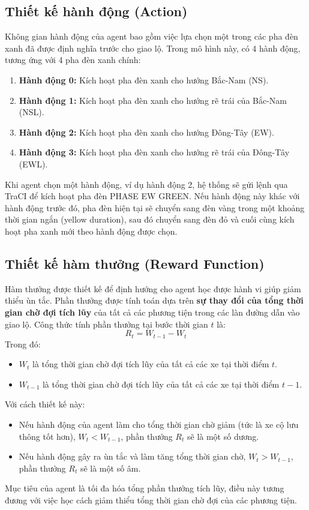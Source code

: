 \subsection{Thiết kế hành động (Action)}
Không gian hành động của agent bao gồm việc lựa chọn một trong các pha đèn xanh
đã được định nghĩa trước cho giao lộ. Trong mô hình này, có 4 hành động, tương ứng
với 4 pha đèn xanh chính:
\begin{enumerate}
    \item \textbf{Hành động 0:} Kích hoạt pha đèn xanh cho hướng Bắc-Nam (NS).

    \item \textbf{Hành động 1:} Kích hoạt pha đèn xanh cho hướng rẽ trái của Bắc-Nam
        (NSL).

    \item \textbf{Hành động 2:} Kích hoạt pha đèn xanh cho hướng Đông-Tây (EW).

    \item \textbf{Hành động 3:} Kích hoạt pha đèn xanh cho hướng rẽ trái của
        Đông-Tây (EWL).
\end{enumerate}

Khi agent chọn một hành động, ví dụ hành động 2, hệ thống sẽ gửi lệnh qua TraCI để kích hoạt pha đèn PHASE EW GREEN. Nếu hành động này khác với hành động trước đó, pha đèn hiện tại sẽ chuyển sang đèn vàng trong một khoảng thời gian ngắn (yellow duration), sau đó chuyển sang đèn đỏ và cuối cùng kích hoạt pha xanh mới theo hành động được chọn.

\subsection{Thiết kế hàm thưởng (Reward Function)}
Hàm thưởng được thiết kế để định hướng cho agent học được hành vi giúp giảm thiểu ùn tắc. Phần thưởng được tính toán dựa trên \textbf{sự thay đổi của tổng thời gian chờ đợi tích lũy} của tất cả các phương tiện trong các làn đường dẫn vào giao lộ. Công thức tính phần thưởng tại bước thời gian $t$ là:
\[
    R_{t} = W_{t-1}- W_{t}
\]
Trong đó:
\begin{itemize}
    \item $W_{t}$ là tổng thời gian chờ đợi tích lũy của tất cả các xe tại thời điểm
        $t$.

    \item $W_{t-1}$ là tổng thời gian chờ đợi tích lũy của tất cả các xe tại thời
        điểm $t-1$.
\end{itemize}
Với cách thiết kế này:
\begin{itemize}
    \item Nếu hành động của agent làm cho tổng thời gian chờ giảm (tức là xe cộ
        lưu thông tốt hơn), $W_{t} < W_{t-1}$, phần thưởng $R_{t}$ sẽ là một số dương.

    \item Nếu hành động gây ra ùn tắc và làm tăng tổng thời gian chờ,
        $W_{t} > W_{t-1}$, phần thưởng $R_{t}$ sẽ là một số âm.
\end{itemize}
Mục tiêu của agent là tối đa hóa tổng phần thưởng tích lũy, điều này tương đương với việc học cách giảm thiểu tổng thời gian chờ đợi của các phương tiện.

